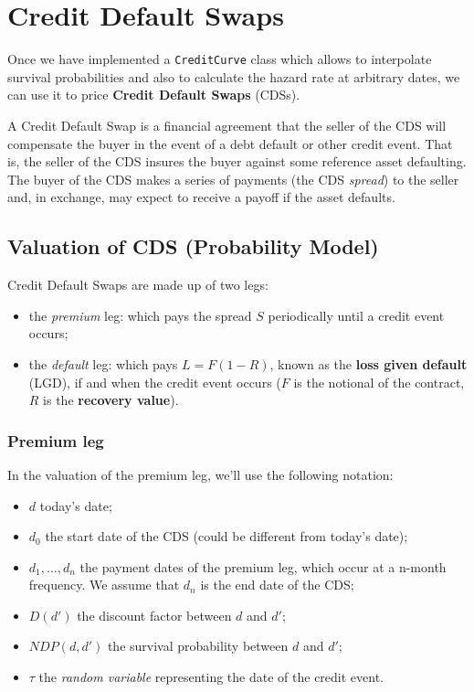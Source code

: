 \section{Credit Default Swaps}\label{credit-deafult-swaps}

Once we have implemented a \texttt{CreditCurve} class which allows to interpolate survival probabilities and also to calculate the hazard rate at arbitrary dates, we can use it to price \textbf{Credit Default Swaps} (CDSs).

A Credit Default Swap is a financial agreement that the seller of the CDS will compensate the buyer in the event of a debt default or other credit event. 
That is, the seller of the CDS insures the buyer against some reference asset defaulting. The buyer of the CDS makes a series of payments (the CDS \emph{spread}) to the seller and, in exchange, may expect to receive a payoff if the asset defaults.

\subsection{Valuation of CDS (Probability Model)}
\label{sec:cds_valuation}

Credit Default Swaps are made up of two legs:

\begin{itemize}
\tightlist
\item
  the \emph{premium} leg: which pays the spread \(S\) periodically until a credit event occurs;
\item
  the \emph{default} leg: which pays \(L = F(1 - R)\), known as the
  \textbf{loss given default} (LGD), if and when the credit event occurs ($F$ is the notional of the contract, $R$ is the \textbf{recovery value}).
\end{itemize}

\subsubsection{Premium leg}\label{premium-leg}

In the valuation of the premium leg, we'll use the following notation:

\begin{itemize}
\tightlist
\item
  \(d\) today's date;
\item
  \(d_0\) the start date of the CDS (could be different from today's date);
\item
  \(d_1, ..., d_n\) the payment dates of the premium leg, which occur at
  a n-month frequency. We assume that \(d_n\) is the end date of the CDS;
\item
  \(D(d')\) the discount factor between \(d\) and \(d'\);
\item
  \(NDP(d, d')\) the survival probability between \(d\) and \(d'\);
\item
  \(\tau\) the \emph{random variable} representing the date of the credit event.
\end{itemize}


